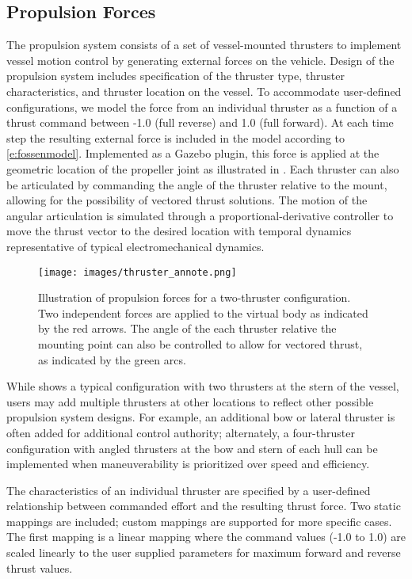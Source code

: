 \documentclass[utf8]{frontiersSCNS} %
\begin{document}
\subsection{Propulsion Forces}
The propulsion system consists of a set of vessel-mounted thrusters to implement vessel motion control by generating external forces on the vehicle.  Design of the propulsion system includes specification of the thruster type,  thruster characteristics, and thruster location on the vessel.  To accommodate user-defined configurations, we model the force from an individual thruster as a function of a thrust command between -1.0 (full reverse) and 1.0 (full forward).  At each time step the resulting external force is included in the model according to \eqref{e:fossenmodel}.  Implemented as a Gazebo plugin, this force is applied at the geometric location of the propeller joint as illustrated in .  Each thruster can also be articulated by commanding the angle of the thruster relative to the mount, allowing for the possibility of vectored thrust solutions.  The motion of the angular articulation is simulated through a proportional-derivative controller to move the thrust vector to the desired location with temporal dynamics representative of typical electromechanical dynamics.

\begin{figure}[hbt!]
  \centering
  \texttt{[image: images/thruster\_annote.png]}
  \caption{Illustration of propulsion forces for a two-thruster configuration.  Two independent forces are applied to the virtual body as indicated by the red arrows.  The angle of the each thruster relative the mounting point can also be controlled to allow for vectored thrust, as indicated by the green arcs.}
  \label{f:thrust}
\end{figure}

While  shows a typical configuration with two thrusters at the stern of the vessel, users may add multiple thrusters at other locations to reflect other possible propulsion system designs.  For example, an additional bow or lateral thruster is often added for additional control authority; alternately, a four-thruster configuration with angled thrusters at the bow and stern of each hull can be implemented when maneuverability is prioritized over speed and efficiency.  

The characteristics of an individual thruster are specified by a user-defined relationship between commanded effort and the resulting thrust force.  Two static mappings are included; custom mappings are supported for more specific cases.  The first mapping is a linear mapping where the command values (-1.0 to 1.0) are scaled linearly to the user supplied parameters for maximum forward and reverse thrust values.  
\end{document}

